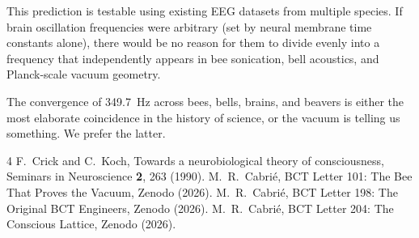 \documentclass[aps,prl,twocolumn,superscriptaddress]{revtex4-2}
\begin{document}
This prediction is testable using existing EEG datasets from multiple species. If brain oscillation frequencies were arbitrary (set by neural membrane time constants alone), there would be no reason for them to divide evenly into a frequency that independently appears in bee sonication, bell acoustics, and Planck-scale vacuum geometry.

\begin{acknowledgments}
The convergence of 349.7~Hz across bees, bells, brains, and beavers is either the most elaborate coincidence in the history of science, or the vacuum is telling us something. We prefer the latter.
\end{acknowledgments}

\begin{thebibliography}{4}
 F.~Crick and C.~Koch, Towards a neurobiological theory of consciousness, Seminars in Neuroscience \textbf{2}, 263 (1990).
 M.~R.~Cabri\'e, BCT Letter 101: The Bee That Proves the Vacuum, Zenodo (2026).
 M.~R.~Cabri\'e, BCT Letter 198: The Original BCT Engineers, Zenodo (2026).
 M.~R.~Cabri\'e, BCT Letter 204: The Conscious Lattice, Zenodo (2026).
\end{thebibliography}
\end{document}
